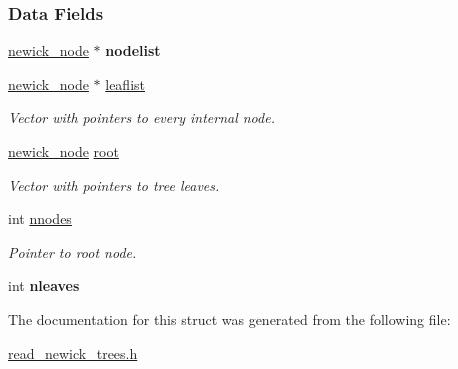 \subsubsection*{Data Fields}
\begin{DoxyCompactItemize}
\item 
\mbox{\label{structnewick__tree__struct_a20ac649fdca11eb6199683d5b5e0a323}} 
\hyperlink{structnewick__node__struct}{newick\+\_\+node} $\ast$ {\bfseries nodelist}
\item 
\mbox{\label{structnewick__tree__struct_a126b90aeb073ef366b41d315669224a9}} 
\hyperlink{structnewick__node__struct}{newick\+\_\+node} $\ast$ \hyperlink{structnewick__tree__struct_a126b90aeb073ef366b41d315669224a9}{leaflist}
\begin{DoxyCompactList}\small\item\em Vector with pointers to every internal node. \end{DoxyCompactList}\item 
\mbox{\label{structnewick__tree__struct_a2225d85fcdecdb67bc87f15a4d3c6e6e}} 
\hyperlink{structnewick__node__struct}{newick\+\_\+node} \hyperlink{structnewick__tree__struct_a2225d85fcdecdb67bc87f15a4d3c6e6e}{root}
\begin{DoxyCompactList}\small\item\em Vector with pointers to tree leaves. \end{DoxyCompactList}\item 
\mbox{\label{structnewick__tree__struct_a1e1324fe64965530222840f6b77c5312}} 
int \hyperlink{structnewick__tree__struct_a1e1324fe64965530222840f6b77c5312}{nnodes}
\begin{DoxyCompactList}\small\item\em Pointer to root node. \end{DoxyCompactList}\item 
\mbox{\label{structnewick__tree__struct_acfeb86d8e0c69b446a984ddd06999c19}} 
int {\bfseries nleaves}
\end{DoxyCompactItemize}


The documentation for this struct was generated from the following file\+:\begin{DoxyCompactItemize}
\item 
\hyperlink{read__newick__trees_8h}{read\+\_\+newick\+\_\+trees.\+h}\end{DoxyCompactItemize}
